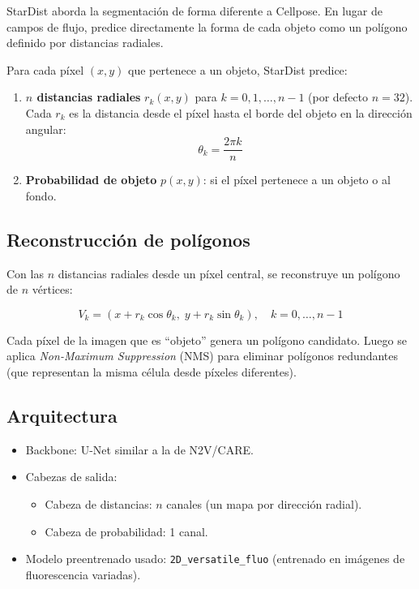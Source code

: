 \documentclass[11pt,a4paper]{article}
\begin{document}
StarDist aborda la segmentaci\'{o}n de forma diferente a Cellpose. En lugar de campos de flujo, predice directamente la forma de cada objeto como un pol\'{i}gono definido por distancias radiales.

Para cada p\'{i}xel $(x, y)$ que pertenece a un objeto, StarDist predice:

\begin{enumerate}
  \item \textbf{$n$ distancias radiales} $r_k(x, y)$ para $k = 0, 1, \ldots, n-1$ (por defecto $n = 32$). Cada $r_k$ es la distancia desde el p\'{i}xel hasta el borde del objeto en la direcci\'{o}n angular:
  \begin{equation}
    \theta_k = \frac{2\pi k}{n}
  \end{equation}
  \item \textbf{Probabilidad de objeto} $p(x, y)$: si el p\'{i}xel pertenece a un objeto o al fondo.
\end{enumerate}

\subsection{Reconstrucci\'{o}n de pol\'{i}gonos}

Con las $n$ distancias radiales desde un p\'{i}xel central, se reconstruye un pol\'{i}gono de $n$ v\'{e}rtices:

\begin{equation}
  V_k = \left( x + r_k \cos\theta_k, \; y + r_k \sin\theta_k \right), \quad k = 0, \ldots, n-1
\end{equation}

Cada p\'{i}xel de la imagen que es ``objeto'' genera un pol\'{i}gono candidato. Luego se aplica \textit{Non-Maximum Suppression} (NMS) para eliminar pol\'{i}gonos redundantes (que representan la misma c\'{e}lula desde p\'{i}xeles diferentes).

\subsection{Arquitectura}

\begin{itemize}
  \item Backbone: U-Net similar a la de N2V/CARE.
  \item Cabezas de salida:
  \begin{itemize}
    \item Cabeza de distancias: $n$ canales (un mapa por direcci\'{o}n radial).
    \item Cabeza de probabilidad: 1 canal.
  \end{itemize}
  \item Modelo preentrenado usado: \texttt{2D\_versatile\_fluo} (entrenado en im\'{a}genes de fluorescencia variadas).
\end{itemize}
\end{document}
